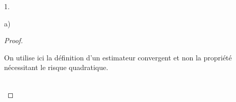 \begin{noliste}{1.}
\begin{noliste}{a)}
\begin{proof}
    \begin{remark}%
    On utilise ici la définition d'un estimateur convergent et non la 
    propriété nécessitant le risque quadratique.
    \end{remark}~\\[-1.4cm]
    \end{proof}
  \end{noliste}
\end{noliste}



